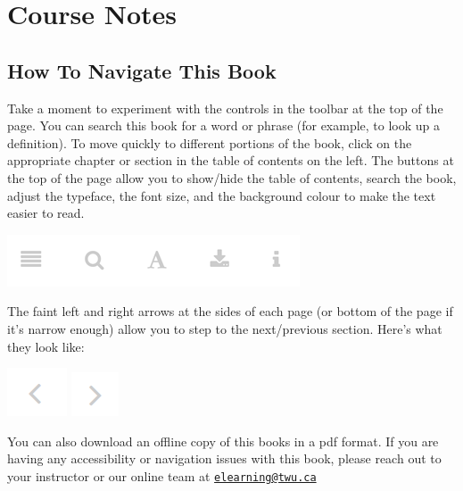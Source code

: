 \documentclass[
]{book}
\begin{document}
\hypertarget{course-notes}{%
\section*{Course Notes}\label{course-notes}}

\hypertarget{how-to-navigate-this-book}{%
\subsection*{How To Navigate This Book}\label{how-to-navigate-this-book}}

Take a moment to experiment with the controls in the toolbar at the top of the page. You can search this book for a word or phrase (for example, to look up a definition). To move quickly to different portions of the book, click on the appropriate chapter or section in the table of contents on the left. The buttons at the top of the page allow you to show/hide the table of contents, search the book, adjust the typeface, the font size, and the background colour to make the text easier to read.

\includegraphics{assets/course-intro/menu.png}

The faint left and right arrows at the sides of each page (or bottom of the page if it's narrow enough) allow you to step to the next/previous section. Here's what they look like:

\includegraphics{assets/course-intro/left_arrow.png} \includegraphics{assets/course-intro/right_arrow.png}

You can also download an offline copy of this books in a pdf format. If you are having any accessibility or navigation issues with this book, please reach out to your instructor or our online team at \href{mailto:elearning@twu.ca}{\nolinkurl{elearning@twu.ca}}
\end{document}
